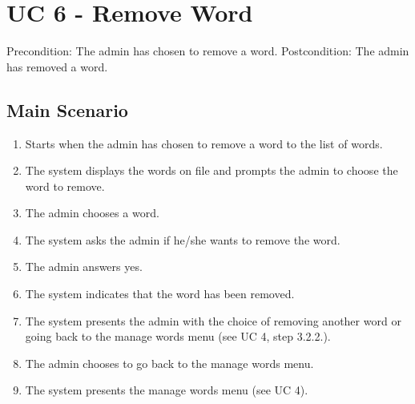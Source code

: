 \documentclass[12pt, letterpaper]{article}
\begin{document}
\section{UC 6 - Remove Word}
Precondition: The admin has chosen to remove a word.
\newline
Postcondition: The admin has removed a word.
\subsection{Main Scenario}
\begin{enumerate}
	\item Starts when the admin has chosen to remove a word to the list of words.
	\item The system displays the words on file and prompts the admin to choose the word to remove.
	\item The admin chooses a word.
	\item The system asks the admin if he/she wants to remove the word.
	\item The admin answers yes.
	\item The system indicates that the word has been removed.
	\item The system presents the admin with the choice of removing another word or going back to the manage words menu (see UC 4, step 3.2.2.).
	\item The admin chooses to go back to the manage words menu.
	\item The system presents the manage words menu (see UC 4).
\end{enumerate}
\end{document}

